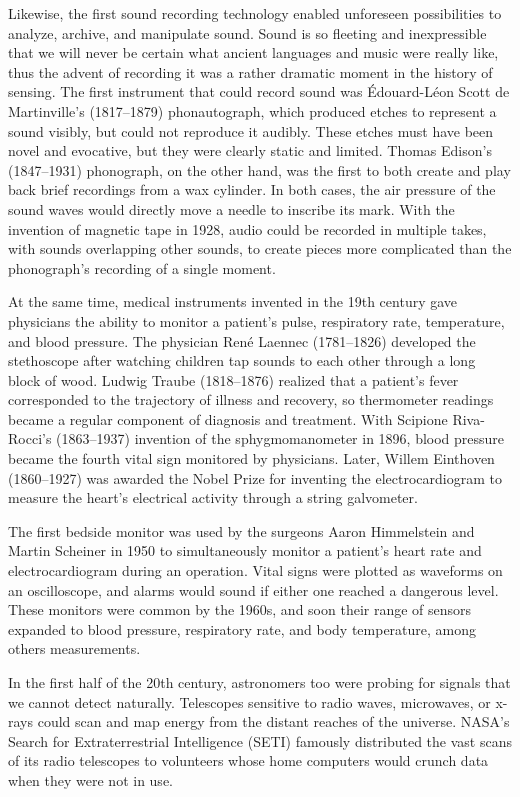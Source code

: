 Likewise, the first sound recording technology enabled unforeseen possibilities
to analyze, archive, and manipulate sound. Sound is so fleeting
and inexpressible that we will never be certain what ancient languages and
music were really like, thus the advent of recording it was a rather dramatic
moment in the history of sensing. The first instrument that could record
sound was Édouard-Léon Scott de Martinville's (1817–1879) phonautograph,
which produced etches to represent a sound visibly, but could not
reproduce it audibly. These etches must have been novel and evocative, but
they were clearly static and limited. Thomas Edison's (1847–1931) phonograph,
on the other hand, was the first to both create and play back brief recordings from a wax cylinder. In both cases, the air pressure of the sound
waves would directly move a needle to inscribe its mark. With the invention
of magnetic tape in 1928, audio could be recorded in multiple takes, with
sounds overlapping other sounds, to create pieces more complicated than
the phonograph's recording of a single moment.

At the same time, medical instruments invented in the 19th century gave
physicians the ability to monitor a patient's pulse, respiratory rate, temperature,
and blood pressure. The physician René Laennec (1781–1826)
developed the stethoscope after watching children tap sounds to each other
through a long block of wood. Ludwig Traube (1818–1876) realized that
a patient's fever corresponded to the trajectory of illness and recovery, so
thermometer readings became a regular component of diagnosis and treatment.
With Scipione Riva-Rocci's (1863–1937) invention of the sphygmomanometer
in 1896, blood pressure became the fourth vital sign monitored
by physicians. Later, Willem Einthoven (1860–1927) was awarded the Nobel
Prize for inventing the electrocardiogram to measure the heart's electrical
activity through a string galvometer.

The first bedside monitor was used by the surgeons Aaron Himmelstein
and Martin Scheiner in 1950 to simultaneously monitor a patient's heart
rate and electrocardiogram during an operation. Vital signs were plotted
as waveforms on an oscilloscope, and alarms would sound if either one
reached a dangerous level. These monitors were common by the 1960s, and
soon their range of sensors expanded to blood pressure, respiratory rate,
and body temperature, among others measurements.

In the first half of the 20th century, astronomers too were probing for signals
that we cannot detect naturally. Telescopes sensitive to radio waves, microwaves,
or x-rays could scan and map energy from the distant reaches of the
universe. NASA's Search for Extraterrestrial Intelligence (SETI) famously
distributed the vast scans of its radio telescopes to volunteers whose home
computers would crunch data when they were not in use.

